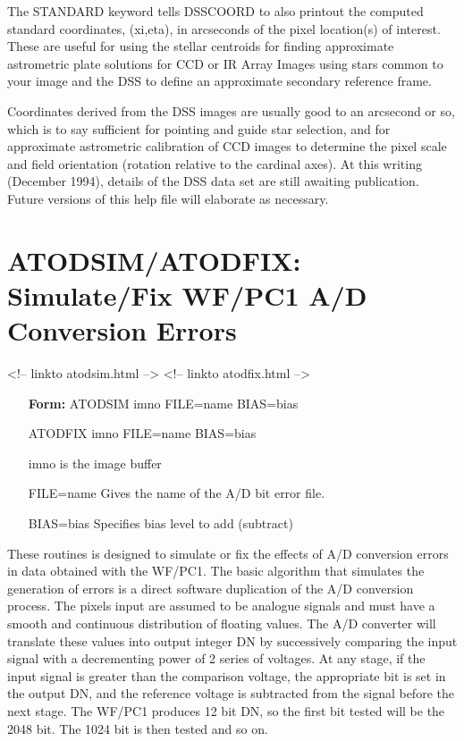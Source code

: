 The STANDARD keyword tells DSSCOORD to also printout the computed standard
coordinates, (xi,eta), in arcseconds of the pixel location(s) of interest.
These are useful for using the stellar centroids for finding approximate
astrometric plate solutions for CCD or IR Array Images using stars common
to your image and the DSS to define an approximate secondary reference
frame.

Coordinates derived from the DSS images are usually good to an arcsecond or
so, which is to say sufficient for pointing and guide star selection, and
for approximate astrometric calibration of CCD images to determine the
pixel scale and field orientation (rotation relative to the cardinal axes).
At this writing (December 1994), details of the DSS data set are still
awaiting publication.  Future versions of this help file will elaborate as
necessary.

\section{ATODSIM/ATODFIX: Simulate/Fix WF/PC1 A/D Conversion Errors}
\begin{rawhtml}
<!-- linkto atodsim.html --> <!-- linkto atodfix.html -->
\end{rawhtml}
 
\begin{itemize}
  \item[\textbf{Form: }ATODSIM imno FILE=name BIAS=bias\hfill]{}
  \item[ATODFIX imno FILE=name BIAS=bias\hfill]{}
  \item[imno]{is the image buffer}
  \item[FILE=name]{Gives the name of the A/D bit error file.}
  \item[BIAS=bias]{Specifies bias level to add (subtract)}
\end{itemize}
 
These routines is designed to simulate or fix the effects of A/D conversion
errors in data obtained with the WF/PC1.  The basic algorithm that
simulates the generation of errors is a direct software duplication of the
A/D conversion process.  The pixels input are assumed to be analogue
signals and must have a smooth and continuous distribution of floating
values.  The A/D converter will translate these values into output integer
DN by successively comparing the input signal with a decrementing power of 2
series of voltages.  At any stage, if the input signal is greater than the
comparison voltage, the appropriate bit is set in the output DN, and the
reference voltage is subtracted from the signal before the next stage.  The
WF/PC1 produces 12 bit DN, so the first bit tested will be the 2048 bit.  The
1024 bit is then tested and so on.

